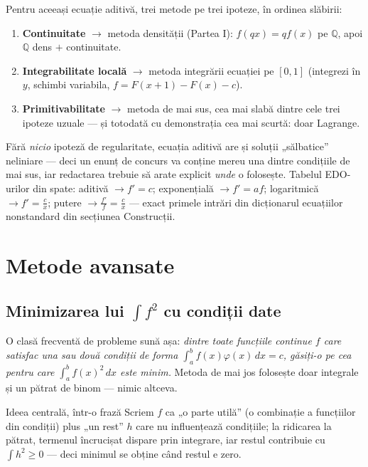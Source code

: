 \begin{obs}
Pentru aceeași ecuație aditivă, trei metode pe trei ipoteze, în ordinea slăbirii:
\begin{enumerate}[leftmargin=*, itemsep=1pt]
\item \textbf{Continuitate} $\to$ metoda densității (Partea I): $f(q x)=qf(x)$ pe $\mathbb{Q}$, apoi $\mathbb{Q}$ dens $+$ continuitate.
\item \textbf{Integrabilitate locală} $\to$ metoda integrării ecuației pe $[0,1]$ (integrezi în $y$, schimbi variabila, $f=F(x{+}1)-F(x)-c$).
\item \textbf{Primitivabilitate} $\to$ metoda de mai sus, cea mai slabă dintre cele trei ipoteze uzuale --- și totodată cu demonstrația cea mai scurtă: doar Lagrange.
\end{enumerate}
Fără \emph{nicio} ipoteză de regularitate, ecuația aditivă are și soluții „sălbatice'' neliniare --- deci un enunț de concurs va conține mereu una dintre condițiile de mai sus, iar redactarea trebuie să arate explicit \emph{unde} o folosește. Tabelul EDO-urilor din spate: aditivă $\to f'=c$; exponențială $\to f'=af$; logaritmică $\to f'=\frac cx$; putere $\to \frac{f'}{f}=\frac cx$ --- exact primele intrări din dicționarul ecuațiilor nonstandard din secțiunea Construcții.
\end{obs}

\section{Metode avansate}

\subsection{Minimizarea lui $\int f^2$ cu condiții date}

O clasă frecventă de probleme sună așa: \emph{dintre toate funcțiile continue $f$ care satisfac una sau două condiții de forma $\int_a^b f(x)\varphi(x)\,dx=c$, găsiți-o pe cea pentru care $\int_a^b f(x)^2\,dx$ este minim.} Metoda de mai jos folosește doar integrale și un pătrat de binom --- nimic altceva.

\begin{tehbox}{Ideea centrală, într-o frază}
Scriem $f$ ca „o parte utilă'' (o combinație a funcțiilor din condiții) plus „un rest'' $h$ care nu influențează condițiile; la ridicarea la pătrat, termenul încrucișat dispare prin integrare, iar restul contribuie cu $\int h^2\ge 0$ --- deci minimul se obține când restul e zero.
\end{tehbox}

